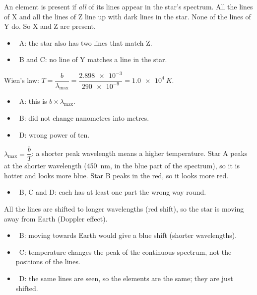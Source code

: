 \documentclass[12pt]{article}
\begin{document}
\begin{practiceanswers}
\begin{practiceans}
  An element is present if \emph{all} of its lines appear in the star's spectrum. All the lines of X
  and all the lines of Z line up with dark lines in the star. None of the lines of Y do. So X and Z are
  present.
  \begin{itemize}
    \item \xmark\ A: the star also has two lines that match Z.
    \item \xmark\ B and C: no line of Y matches a line in the star.
  \end{itemize}
\end{practiceans}

\begin{practiceans}
  Wien's law: $T = \dfrac{b}{\lambda_\mathrm{max}} = \dfrac{\num{2.898e-3}}{\num{290e-9}} = \qty{1.0e4}{K}$.
  \begin{itemize}
    \item \xmark\ A: this is $b \times \lambda_\mathrm{max}$.
    \item \xmark\ B: did not change nanometres into metres.
    \item \xmark\ D: wrong power of ten.
  \end{itemize}
\end{practiceans}

\begin{practiceans}
  $\lambda_\mathrm{max} = \dfrac{b}{T}$: a shorter peak wavelength means a higher temperature. Star A
  peaks at the shorter wavelength (\qty{450}{nm}, in the blue part of the spectrum), so it is hotter
  and looks more blue. Star B peaks in the red, so it looks more red.
  \begin{itemize}
    \item \xmark\ B, C and D: each has at least one part the wrong way round.
  \end{itemize}
\end{practiceans}

\begin{practiceans}
  All the lines are shifted to longer wavelengths (red shift), so the star is moving away from Earth
  (Doppler effect).
  \begin{itemize}
    \item \xmark\ B: moving towards Earth would give a blue shift (shorter wavelengths).
    \item \xmark\ C: temperature changes the peak of the continuous spectrum, not the positions of the
          lines.
    \item \xmark\ D: the same lines are seen, so the elements are the same; they are just shifted.
  \end{itemize}
\end{practiceans}


\end{practiceanswers}
\end{document}

